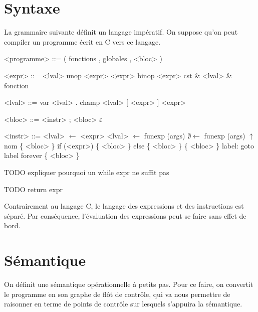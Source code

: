\documentclass{article}
\newenvironment{grammarf}{\shorthandoff{:}\begin{grammar}}{\end{grammar}\shorthandon{:}}
\begin{document}
\section{Syntaxe}

La grammaire suivante définit un langage impératif. On suppose qu'on peut
compiler un programme écrit en C vers ce langage.

\begin{grammarf}
<programme> ::= ( fonctions , globales , <bloc> )
\end{grammarf}
\begin{minipage}{0.4\textwidth}
\begin{grammarf}
    <expr> ::= <lval>
          \alt unop <expr>
          \alt <expr> binop <expr>
          \alt cst
          \alt \& <lval>
          \alt \& fonction

    <lval> ::= var
          \alt <lval> . champ
          \alt <lval> [ <expr> ]
          \alt * <expr>
\end{grammarf}
\end{minipage}
\begin{minipage}{0.4\textwidth}
\begin{grammarf}
     <bloc> ::= <instr> ; <bloc>
           \alt $ε$

    <instr> ::= <lval> $←$ <expr>
           \alt <lval> $←$ funexp (args)
           \alt  $∅ ←$ funexp (args)
           \alt $↑$ nom \{ <bloc> \}
           \alt if (<expr>) \{ <bloc> \} else \{ <bloc> \}
           \alt \{ <bloc> \} label:
           \alt goto label
           \alt forever \{ <bloc> \}
\end{grammarf}
\end{minipage}

TODO expliquer pourquoi un while expr ne suffit pas

TODO return expr

Contrairement au langage C, le langage des expressions et des instructions est
séparé. Par conséquence, l'évaluation des expressions peut se faire sans effet de
bord.

\section{Sémantique}

On définit une sémantique opérationnelle à petits pas. Pour ce faire, on
convertit le programme en son graphe de flôt de contrôle, qui va nous permettre
de raisonner en terme de points de contrôle sur lesquels s'appuira la
sémantique.
\end{document}
